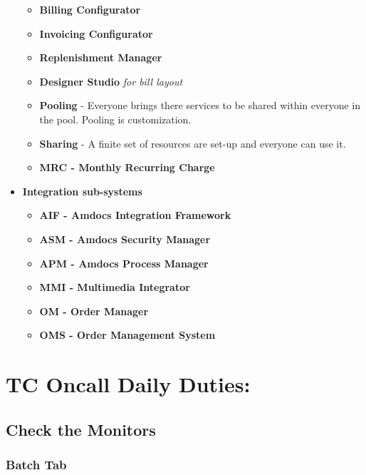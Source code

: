 \documentclass[12pt,twoside]{article}
\begin{document}
\begin{itemize}
\begin{itemize}
\item \textbf{Billing Configurator}
\item \textbf{Invoicing Configurator}
\item \textbf{Replenishment Manager}
\item \textbf{Designer Studio} \emph{for bill layout}
\item \textbf{Pooling} - Everyone brings there services to be shared within
     everyone in the pool. Pooling is customization.
\item \textbf{Sharing} - A finite set of resources are set-up and everyone can
     use it.
\item \textbf{MRC - Monthly Recurring Charge}
\end{itemize}
\item \textbf{Integration sub-systems}
\begin{itemize}
\item \textbf{AIF - Amdocs Integration Framework}
\item \textbf{ASM - Amdocs Security Manager}
\item \textbf{APM - Amdocs Process Manager}
\item \textbf{MMI - Multimedia Integrator}
\item \textbf{OM - Order Manager}
\item \textbf{OMS - Order Management System}
\end{itemize}
\end{itemize}
\section{TC Oncall Daily Duties:}
\label{sec-4}
\subsection{Check the Monitors}
\label{sec-4-1}
\subsubsection{Batch Tab}
\label{sec-4-1-1}
\end{document}
